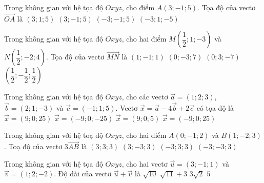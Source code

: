 \begin{ex}%
Trong không gian với hệ tọa độ $Oxyz$, cho điểm $A(3;-1;5)$. Tọa độ của vectơ $\overrightarrow{OA}$ là
\choice
{$(3;1;5)$}
{\True $(3;-1;5)$}
{$(-3;-1;5)$}
{$(-3;1;-5)$}
\end{ex}


\begin{ex}%
Trong không gian với hệ tọa độ $Oxyz$, cho hai điểm $M\left(\dfrac{1}{2};1;-3\right)$ và $N\left(\dfrac{1}{2};-2;4\right)$. Tọa độ của vectơ $\overrightarrow{MN}$ là
\choice
{$(1;-1;1)$}
{\True $(0;-3;7)$}
{$(0;3;-7)$}
{$\left(\dfrac{1}{2};-\dfrac{1}{2};\dfrac{1}{2} \right)$}
\end{ex}


\begin{ex}%
Trong không gian với hệ tọa độ $Oxyz$, cho các vectơ $\overrightarrow{a}=(1;2;3)$, $\overrightarrow{b}=(2;1;-3)$ và $\overrightarrow{c}=(-1;1;5)$. Vectơ $\overrightarrow{x}=\overrightarrow{a}-4\overrightarrow{b}+2\overrightarrow{c}$ có tọa độ là
\choice
{$\overrightarrow{x}=(9;0;25)$}
{$\overrightarrow{x}=(-9;0;-25)$}
{$\overrightarrow{x}=(9;0;5)$}
{\True $\overrightarrow{x}=(-9;0;25)$}
\end{ex}


\begin{ex}%
Trong không gian với hệ toạ độ $Oxyz$, cho hai điểm $A(0;-1;2)$ và $B(1;-2;3)$. Toạ độ của vectơ $3\overrightarrow{AB}$ là
\choice
{$(3;3;3)$}
{\True $(3;-3;3)$}
{$(-3;3;3)$}
{$(-3;-3;3)$}
\end{ex}


\begin{ex}%
Trong không gian với hệ tọa độ $Oxyz$, cho hai vectơ $\overrightarrow{u}=(3;-1;1)$ và $\overrightarrow{v}=(1;2;-2)$. Độ dài của vectơ $\overrightarrow{u}+\overrightarrow{v}$ là
\choice
{$\sqrt{10}$}
{$\sqrt{11}+3$}
{\True $3\sqrt{2}$}
{$5$}
\end{ex}


